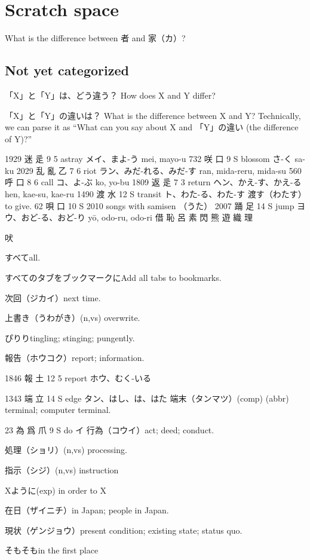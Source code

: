 \chapter{Scratch space}

What is the difference between 者 and 家（カ）?

\section{Not yet categorized}

「X」と「Y」は、どう違う？
How does X and Y differ?

「X」と「Y」の違いは？
What is the difference between X and Y?
Technically, we can parse it as
``What can you say about X and 「Y」の違い (the difference of Y)?''

1929 迷 辵 9 5 astray メイ、まよ-う mei, mayo-u
732 咲 口 9 S blossom さ-く sa-ku
2029 乱 亂 乙 7 6 riot ラン、みだ-れる、みだ-す ran, mida-reru, mida-su
560 呼 口 8 6 call コ、よ-ぶ ko, yo-bu
1809 返 辵 7 3 return ヘン、かえ-す、かえ-る hen, kae-su, kae-ru
1490	渡		水	12	S		transit	ト、わた-る、わた-す
渡す（わたす）to give.
62	唄		口	10	S	2010	songs with samisen	（うた）
2007 踊 足 14 S jump ヨウ、おど-る、おど-り yō, odo-ru, odo-ri
借
恥
呂
素
閃
熊
遊
織
理

吠

すべてall.

すべてのタブをブックマークにAdd all tabs to bookmarks.

次回（ジカイ）next time.

上書き（うわがき）(n,vs) overwrite.

ぴりりtingling; stinging; pungently.

報告（ホウコク）report; information.

1846	報		土	12	5		report	ホウ、むく-いる

1343	端		立	14	S		edge	タン、はし、は、はた
端末（タンマツ）(comp) (abbr) terminal; computer terminal.

23	為	爲	爪	9	S		do	イ
行為（コウイ）act; deed; conduct.

処理（ショリ）(n,vs) processing.

指示（シジ）(n,vs) instruction

Xように(exp) in order to X

在日（ザイニチ）in Japan; people in Japan.

現状（ゲンジョウ）present condition; existing state; status quo.

そもそもin the first place

